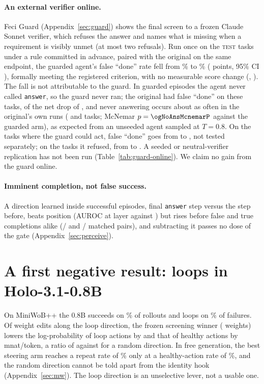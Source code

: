 \paragraph{An external verifier online.} Feci Guard (Appendix~\ref{sec:guard}) shows the final screen to a frozen Claude Sonnet verifier, which refuses the answer and names what is missing when a requirement is visibly unmet (at most two refusals). Run once on the \OgN{} \textsc{test} tasks under a rule committed in advance, paired with the original on the same endpoint, the guarded agent's false ``done'' rate fell from \OgFdBase\% to \OgFdGuard\% (\OgFdDiff{} points, 95\% CI \OgFdDiffCi), formally meeting the registered criterion, with no measurable score change (\OgScoreDiff, \OgScoreDiffCi). The fall is not attributable to the guard. In \ogDecNoAnsN{} guarded episodes the agent never called \texttt{answer}, so the guard never ran; the original had \ogDecNoAnsFdb{} false ``done'' on these tasks, \ogDecNoAnsFdb{} of the net drop of \ogFdNetDrop, and never answering occurs about as often in the original's own runs (\ogNoAnsModal{} and \ogNoAnsPod{} tasks; McNemar $p=\ogNoAnsMcnemarP$ against the guarded arm), as expected from an unseeded agent sampled at $T=0.8$. On the \ogDecAnsN{} tasks where the guard could act, false ``done'' goes from \ogDecAnsFdb{} to \ogDecAnsFdg, not tested separately; on the \ogDecRefN{} tasks it refused, from \ogDecRefFdb{} to \ogDecRefFdg. A seeded or neutral-verifier replication has not been run (Table~\ref{tab:guard-online}). We claim no gain from the guard online.


\paragraph{Imminent completion, not false success.} A direction learned inside successful episodes, final \texttt{answer} step versus the step before, beats position (AUROC \pcAuc{} at layer \pcLayer{} against \pcBaseStep) but rises before false and true completions alike (\pcFsPosPositive/\pcMatchN{} and \pcFsNegPositive/\pcMatchN{} matched pairs), and subtracting it passes no dose of the gate (Appendix~\ref{sec:perceive}).

\section{A first negative result: loops in Holo-3.1-0.8B}
\label{nsec:mw}
On MiniWoB++ the 0.8B succeeds on \mwSuccessPct\% of \mwNNormal{} rollouts and loops on \mwLoopSharePct\% of failures. Of \mwOffNCand{} weight edits along the loop direction, the frozen screening winner (\mwPatchChanged{} weights) lowers the log-probability of loop actions by \mwFinLoopDec{} and that of healthy actions by \mwFinHealthyDec{} mnat/token, a ratio of \mwFinRatio{} against \mwFinRatioRand{} for a random direction. In free generation, the best steering arm reaches a repeat rate of \mwStNativeRepeat\% only at a healthy-action rate of \mwStNativeHealth\%, and the random direction cannot be told apart from the identity hook (Appendix~\ref{sec:mw}). The loop direction is an unselective lever, not a usable one.

